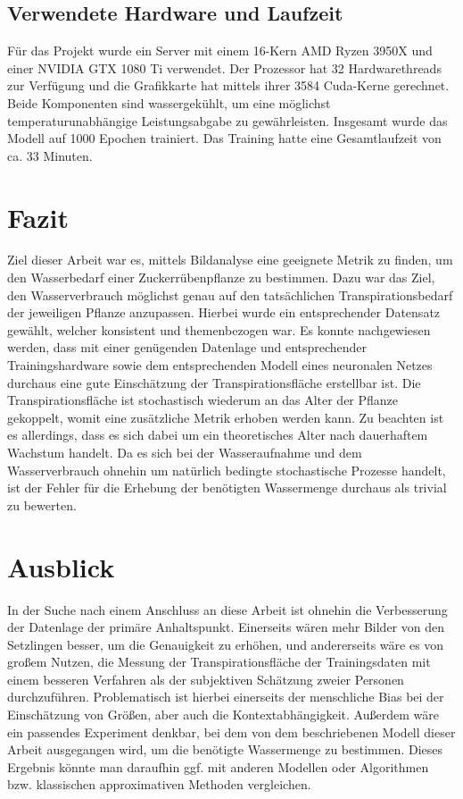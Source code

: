 \subsection{Verwendete Hardware und Laufzeit}
Für das Projekt wurde ein Server mit einem 16-Kern AMD Ryzen 3950X und einer NVIDIA GTX 1080 Ti verwendet. Der Prozessor hat 32 Hardwarethreads zur Verfügung und die Grafikkarte hat mittels ihrer 3584 Cuda-Kerne gerechnet. Beide Komponenten sind wassergekühlt, um eine möglichst temperaturunabhängige Leistungsabgabe zu gewährleisten. Insgesamt wurde das Modell auf 1000 Epochen trainiert. Das Training hatte eine Gesamtlaufzeit von ca. 33 Minuten.
\section{Fazit}
Ziel dieser Arbeit war es, mittels Bildanalyse eine geeignete Metrik zu finden, um den Wasserbedarf einer Zuckerrübenpflanze zu bestimmen. Dazu war das Ziel, den Wasserverbrauch möglichst genau auf den tatsächlichen Transpirationsbedarf der jeweiligen Pflanze anzupassen. Hierbei wurde ein entsprechender Datensatz gewählt, welcher konsistent und themenbezogen war. Es konnte nachgewiesen werden, dass mit einer genügenden Datenlage und entsprechender Trainingshardware sowie dem entsprechenden Modell eines neuronalen Netzes durchaus eine gute Einschätzung der Transpirationsfläche erstellbar ist. Die Transpirationsfläche ist stochastisch wiederum an das Alter der Pflanze gekoppelt, womit eine zusätzliche Metrik erhoben werden kann. Zu beachten ist es allerdings, dass es sich dabei um ein theoretisches Alter nach dauerhaftem Wachstum handelt. Da es sich bei der Wasseraufnahme und dem Wasserverbrauch ohnehin um natürlich bedingte stochastische Prozesse handelt, ist der Fehler für die Erhebung der benötigten Wassermenge durchaus als trivial zu bewerten.
\section{Ausblick}
In der Suche nach einem Anschluss an diese Arbeit ist ohnehin die Verbesserung der Datenlage der primäre Anhaltspunkt. Einerseits wären mehr Bilder von den Setzlingen besser, um die Genauigkeit zu erhöhen, und andererseits wäre es von großem Nutzen, die Messung der Transpirationsfläche der Trainingsdaten mit einem besseren Verfahren als der subjektiven Schätzung zweier Personen durchzuführen. Problematisch ist hierbei einerseits der menschliche Bias bei der Einschätzung von Größen, aber auch die Kontextabhängigkeit. Außerdem wäre ein passendes Experiment denkbar, bei dem von dem beschriebenen Modell dieser Arbeit ausgegangen wird, um die benötigte Wassermenge zu bestimmen. Dieses Ergebnis könnte man daraufhin ggf. mit anderen Modellen oder Algorithmen bzw. klassischen approximativen Methoden vergleichen.
\newpage
